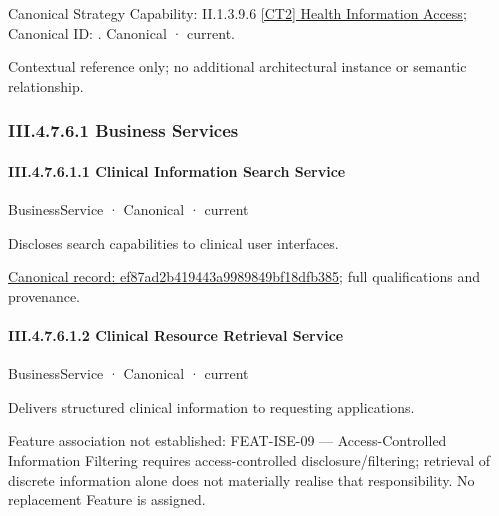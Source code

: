 {\small Canonical Strategy Capability: II.1.3.9.6 \hyperref[element:cc253aea3c5f489da0502df74dde1669]{[CT2] Health Information Access}; Canonical ID: \texttt{}. Canonical · current.}\par
Contextual reference only; no additional architectural instance or semantic relationship.\par
\subsubsection*{III.4.7.6.1 Business Services}
\label{navigation:III.4.7.6.1}

\paragraph*{III.4.7.6.1.1 Clinical Information Search Service}
\label{navigation:III.4.7.6.1.1}

\label{element:ef87ad2b419443a9989849bf18dfb385}
{\small BusinessService · Canonical · current}\par

Discloses search capabilities to clinical user interfaces.


{\footnotesize \href{../../../../../../../continuum/business/business-service/ef87ad2b419443a9989849bf18dfb385.md}{Canonical record: ef87ad2b419443a9989849bf18dfb385}; full qualifications and provenance.}\par
\paragraph*{III.4.7.6.1.2 Clinical Resource Retrieval Service}
\label{navigation:III.4.7.6.1.2}

\label{element:3cdde3bb6a204c46b08468e080f2545a}
{\small BusinessService · Canonical · current}\par

Delivers structured clinical information to requesting applications.



Feature association not established: FEAT-ISE-09 — Access-Controlled Information Filtering requires access-controlled disclosure/filtering; retrieval of discrete information alone does not materially realise that responsibility. No replacement Feature is assigned.


